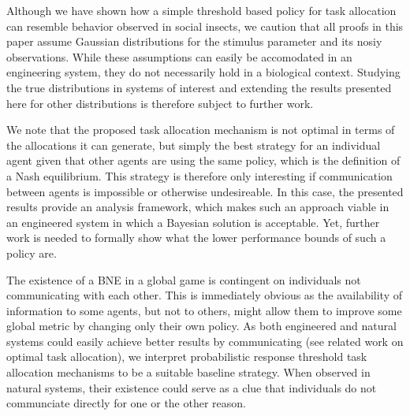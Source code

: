 \documentclass[smallextended]{svjour3}       %
\begin{document}
Although we have shown how a simple threshold based policy for task allocation can resemble behavior observed in social insects, we caution that all proofs in this paper assume Gaussian distributions for the stimulus parameter and its nosiy observations. While these assumptions can easily be accomodated in an engineering system, they do not necessarily hold in a biological context. Studying the true distributions in systems of interest and extending the results presented here for other distributions is therefore subject to further work.

We  note that the proposed task allocation mechanism is not optimal in terms of the allocations it can generate, but simply the best strategy for an individual agent given that other agents are using the same policy, which is the definition of a Nash equilibrium.  This strategy is therefore only interesting if communication between agents is impossible or otherwise undesireable. In this case, the presented results provide an analysis framework, which makes such an approach viable in an engineered system in which a Bayesian solution is acceptable. Yet, further work is needed to formally show what the lower performance bounds of such a policy are. 


The existence of a BNE in a global game is contingent on individuals not communicating with each other. This is immediately obvious as the availability of information to some agents, but not to others, might allow them to improve some global metric by changing only their own policy. As both engineered and natural systems could easily achieve better results by communicating (see related work on optimal task allocation), we interpret probabilistic response threshold task allocation mechanisms to be a suitable baseline strategy. When observed in natural systems, their existence could serve as a clue that individuals do not communciate directly for one or the other reason.
\end{document}
